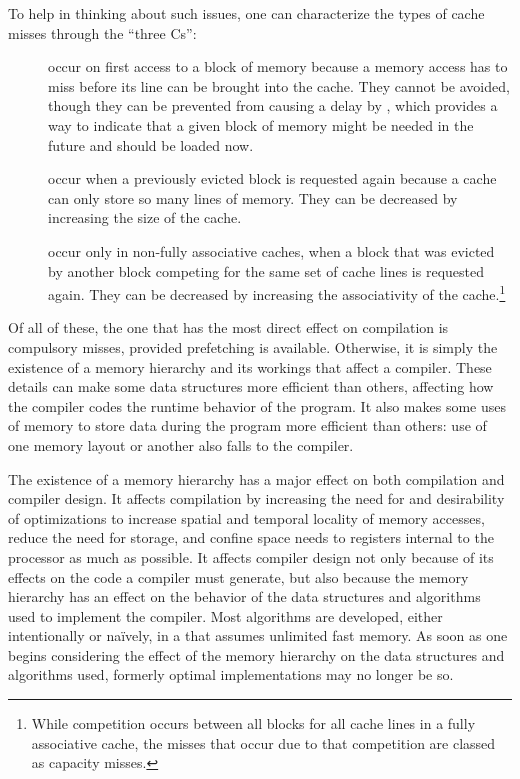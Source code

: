 To help in thinking about such issues, one can characterize the types of cache misses through the ``three Cs'':
\begin{description}
\item[] occur on first access to a block of memory because a memory access has to miss before its line can be brought into the cache. They cannot be avoided, though they can be prevented from causing a delay by , which provides a way to indicate that a given block of memory might be needed in the future and should be loaded now.
\item[] occur when a previously evicted block is requested again because a cache can only store so many lines of memory. They can be decreased by increasing the size of the cache.
\item[] occur only in non-fully associative caches, when a block that was evicted by another block competing for the same set of cache lines is requested again. They can be decreased by increasing the associativity of the cache.\footnote{While competition occurs between all blocks for all cache lines in a fully associative cache, the misses that occur due to that competition are classed as capacity misses.}
\end{description}
Of all of these, the one that has the most direct effect on compilation is compulsory misses, provided prefetching is available. Otherwise, it is simply the existence of a memory hierarchy and its workings that affect a compiler. These details can make some data structures more efficient than others, affecting how the compiler codes the runtime behavior of the program. It also makes some uses of memory to store data during the program more efficient than others: use of one memory layout or another also falls to the compiler.

The existence of a memory hierarchy has a major effect on both compilation and compiler design. It affects compilation by increasing the need for and desirability of optimizations to increase spatial and temporal locality of memory accesses, reduce the need for storage, and confine space needs to registers internal to the processor as much as possible. It affects compiler design not only because of its effects on the code a compiler must generate, but also because the memory hierarchy has an effect on the behavior of the data structures and algorithms used to implement the compiler. Most algorithms are developed, either intentionally or na\"ively, in a  that assumes unlimited fast memory. As soon as one begins considering the effect of the memory hierarchy on the data structures and algorithms used, formerly optimal implementations may no longer be so.

